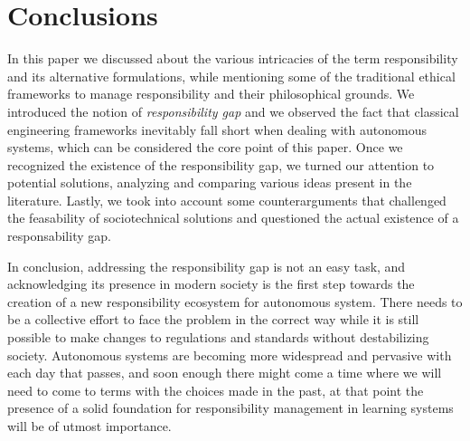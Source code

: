 \section{Conclusions}\label{sec:conclusions}

In this paper we discussed about the various intricacies of the term responsibility and its alternative formulations, while mentioning some of the traditional ethical frameworks to manage responsibility and their philosophical grounds.
We introduced the notion of \textit{responsibility gap} and we observed the fact that classical engineering frameworks inevitably fall short when dealing with autonomous systems, which can be considered the core point of this paper.
Once we recognized the existence of the responsibility gap, we turned our attention to potential solutions, analyzing and comparing various ideas present in the literature.
Lastly, we took into account some counterarguments that challenged the feasability of sociotechnical solutions and questioned the actual existence of a responsability gap.

In conclusion, addressing the responsibility gap is not an easy task, and acknowledging its presence in modern society is the first step towards the creation of a new responsibility ecosystem for autonomous system.
There needs to be a collective effort to face the problem in the correct way while it is still possible to make changes to regulations and standards without destabilizing society.
Autonomous systems are becoming more widespread and pervasive with each day that passes, and soon enough there might come a time where we will need to come to terms with the choices made in the past, at that point the presence of a solid foundation for responsibility management in learning systems will be of utmost importance.